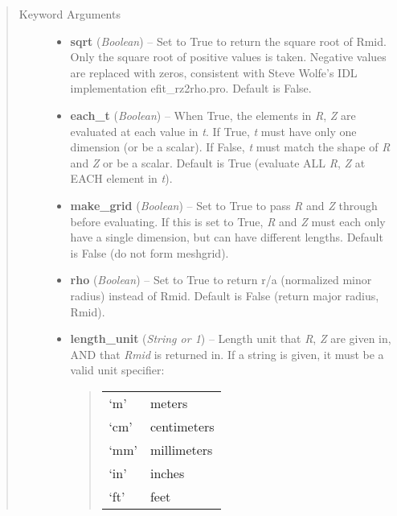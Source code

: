 \documentclass[letterpaper,10pt,english]{sphinxmanual}
\begin{document}
\begin{fulllineitems}
\begin{fulllineitems}
\begin{quote}
\begin{description}
\begin{itemize}
\end{itemize}

\item[{Keyword Arguments}] \leavevmode\begin{itemize}
\item {} 
\textbf{sqrt} (\emph{Boolean}) --
Set to True to return the square root of Rmid.
Only the square root of positive values is taken. Negative
values are replaced with zeros, consistent with Steve Wolfe's
IDL implementation efit\_rz2rho.pro. Default is False.

\item {} 
\textbf{each\_t} (\emph{Boolean}) --
When True, the elements in \emph{R}, \emph{Z} are evaluated
at each value in \emph{t}. If True, \emph{t} must have only one dimension
(or be a scalar). If False, \emph{t} must match the shape of \emph{R} and
\emph{Z} or be a scalar. Default is True (evaluate ALL \emph{R}, \emph{Z} at
EACH element in \emph{t}).

\item {} 
\textbf{make\_grid} (\emph{Boolean}) --
Set to True to pass \emph{R} and \emph{Z} through
 before evaluating. If this is set to
True, \emph{R} and \emph{Z} must each only have a single dimension, but
can have different lengths. Default is False (do not form
meshgrid).

\item {} 
\textbf{rho} (\emph{Boolean}) --
Set to True to return r/a (normalized minor radius)
instead of Rmid. Default is False (return major radius, Rmid).

\item {} 
\textbf{length\_unit} (\emph{String or 1}) --
Length unit that \emph{R}, \emph{Z} are given in,
AND that \emph{Rmid} is returned in. If a string is given, it must
be a valid unit specifier:
\begin{quote}

\begin{tabulary}{\linewidth}{|L|L|}
\hline

`m'
 & 
meters
\\

`cm'
 & 
centimeters
\\

`mm'
 & 
millimeters
\\

`in'
 & 
inches
\\

`ft'
 & 
feet
\\


\end{tabulary}
\end{quote}
\end{itemize}
\end{description}
\end{quote}
\end{fulllineitems}
\end{fulllineitems}
\end{document}
